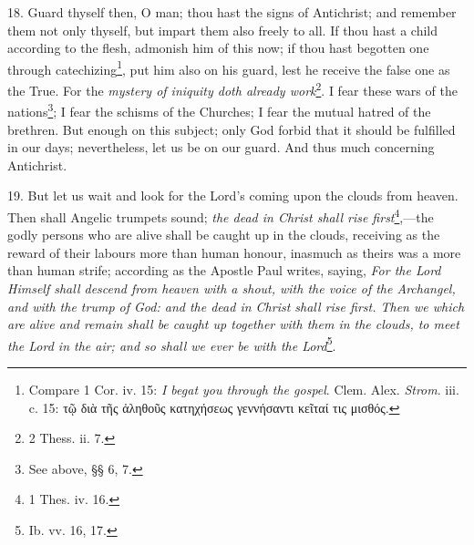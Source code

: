 18. Guard thyself then, O man; thou hast the signs of Antichrist; and remember them not only thyself, but impart them also freely to all. If thou hast a child according to the flesh, admonish him of this now; if thou hast begotten one through catechizing\footnote{Compare 1 Cor. iv. 15: \emph{I begat you through the gospel}. Clem. Alex. \emph{Strom}. iii. c. 15: \textgreek{τῷ διὰ τῆς ἀληθοῦς κατηχήσεως γεννήσαντι κεῖταί τις μισθός}.}, put him also on his guard, lest he receive the false one as the True. For the \emph{mystery of iniquity doth already work}\footnote{2 Thess. ii. 7.}. I fear these wars of the nations\footnote{See above, §§ 6, 7.}; I fear the schisms of the Churches; I fear the mutual hatred of the brethren. But enough on this subject; only God forbid that it should be fulfilled in our days; nevertheless, let us be on our guard. And thus much concerning Antichrist.

19. But let us wait and look for the Lord’s coming upon the clouds from heaven. Then shall Angelic trumpets sound; \emph{the dead in Christ shall rise first}\footnote{1 Thes. iv. 16.},—the godly persons who are alive shall be caught up in the clouds, receiving as the reward of their labours more than human honour, inasmuch as theirs was a more than human strife; according as the Apostle Paul writes, saying, \emph{For the Lord Himself shall descend from heaven with a shout, with the voice of the Archangel, and with the trump of God: and the dead in Christ shall rise first. Then we which are alive and remain shall be caught up together with them in the clouds, to meet the Lord in the air; and so shall we ever be with the Lord}\footnote{Ib. vv. 16, 17.}.

